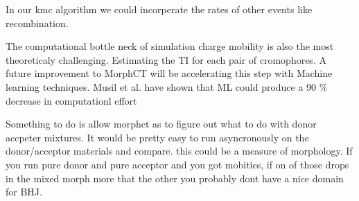 In our kmc algorithm we could incorperate the rates of other events like recombination.

The computational bottle neck of simulation charge mobility is also the most theoreticaly challenging.
Estimating the TI for each pair of cromophores. A future improvement to MorphCT will be accelerating this step
with Machine learning techniques. Musil et al. have shown that ML could produce a 90 \% decrease in
computationl effort \cite{Musil2018}

Something to do is allow morphct as to figure out what to do with donor accpeter mixtures. It would be pretty
easy to run asyncronously on the donor/acceptor materials and compare. this could be a measure of morphology.
If you run pure donor and pure acceptor and you got mobities, if on of those drops in the mixed morph more
that the other you probably dont have a nice domain for BHJ.

